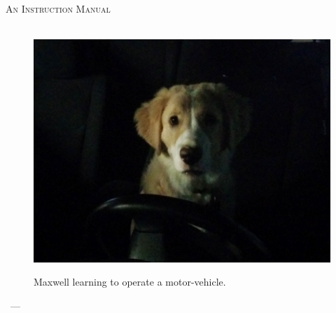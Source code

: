 \begin{titlepage}
    \begin{center}
        \ %
        \textsc{\huge \thetitle}\\
        \textsc{An Instruction Manual}\\[1em]
        \HRule \\[1em]

        \begin{figure}[h!]
            \centering
            \caption{Maxwell learning to operate a motor-vehicle.}
            \includegraphics[width=.75\textwidth]{./images/max/title.jpg}
            \label{fig:max_title}
        \end{figure}

        \vfill
        {
            \large \theauthor \  --- \large \thedate
        }

    \end{center}
\end{titlepage}
